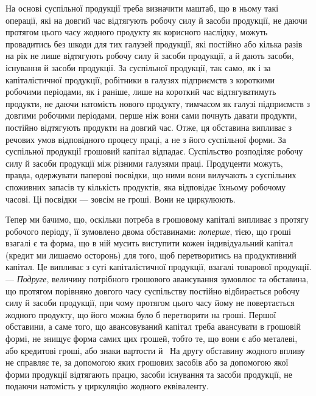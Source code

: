
На основі суспільної продукції треба визначити маштаб, що в ньому
такі операції, які на довгий час відтягують робочу силу й засоби продукції,
не даючи протягом цього часу жодного продукту як корисного
наслідку, можуть провадитись без шкоди для тих галузей продукції, які
постійно або кілька разів на рік не лише відтягують робочу силу й засоби
продукції, а й дають засоби, існування й засоби продукції. За суспільної
продукції, так само, як і за капіталістичної продукції, робітники
в галузях підприємств з короткими робочими періодами, як і раніше, лише
на короткий час відтягуватимуть продукти, не даючи натомість нового
продукту, тимчасом як галузі підприємств з довгими робочими періодами,
перше ніж вони сами почнуть давати продукти, постійно відтягують
продукти на довгий час. Отже, ця обставина випливає з речових
умов відповідного процесу праці, а не з його суспільної форми. За суспільної
продукції грошовий капітал відпадає. Суспільство розподіляє робочу
силу й засоби продукції між різними галузями праці. Продуценти
можуть, правда, одержувати паперові посвідки, що ними вони вилучають
з суспільних споживних запасів ту кількість продуктів, яка відповідає їхньому
робочому часові. Ці посвідки — зовсім не гроші. Вони не циркулюють.

Тепер ми бачимо, що, оскільки потреба в грошовому капіталі випливає
з протягу робочого періоду, її зумовлено двома обставинами: \emph{поперше},
тією, що гроші взагалі є та форма, що в ній мусить виступити
кожен індивідуальний капітал (кредит ми лишаємо осторонь) для того,
щоб перетворитись на продуктивний капітал. Це випливає з суті капіталістичної
продукції, взагалі товарової продукції. — \emph{Подруге}, величину
потрібного грошового авансування зумовлює та обставина, що протягом
порівняно довгого часу суспільству постійно відбирається робочу силу
й засоби продукції, при чому протягом цього часу йому не повертається
жодного продукту, що його можна було б перетворити на гроші.
Першої обставини, а саме того, що авансовуваний капітал треба авансувати
в грошовій формі, не знищує форма самих цих грошей, тобто те,
що вони є або металеві, або кредитові гроші, або знаки вартости й~ На другу обставину жодного впливу не справляє те, за допомогою
яких грошових засобів або за допомогою якої форми продукції
відтягають працю, засоби існування та засоби продукції, не подаючи
натомість у циркуляцію жодного еквіваленту.
\label{original-273}
